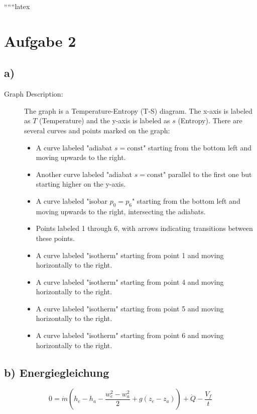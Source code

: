 
``````latex


\section*{Aufgabe 2}

\subsection*{a)}

\begin{description}
    \item[Graph Description:] The graph is a Temperature-Entropy (T-S) diagram. The x-axis is labeled as $T$ (Temperature) and the y-axis is labeled as $s$ (Entropy). There are several curves and points marked on the graph:
    \begin{itemize}
        \item A curve labeled "adiabat $s = \text{const}$" starting from the bottom left and moving upwards to the right.
        \item Another curve labeled "adiabat $s = \text{const}$" parallel to the first one but starting higher on the y-axis.
        \item A curve labeled "isobar $p_0 = p_6$" starting from the bottom left and moving upwards to the right, intersecting the adiabats.
        \item Points labeled 1 through 6, with arrows indicating transitions between these points.
        \item A curve labeled "isotherm" starting from point 1 and moving horizontally to the right.
        \item A curve labeled "isotherm" starting from point 4 and moving horizontally to the right.
        \item A curve labeled "isotherm" starting from point 5 and moving horizontally to the right.
        \item A curve labeled "isotherm" starting from point 6 and moving horizontally to the right.
    \end{itemize}
\end{description}

\subsection*{b) Energiegleichung}

\begin{equation}
0 = \dot{m} \left( h_e - h_a - \frac{w_e^2 - w_a^2}{2} + g(z_e - z_a) \right) + \dot{Q} - \frac{V_f}{t}
\end{equation}

